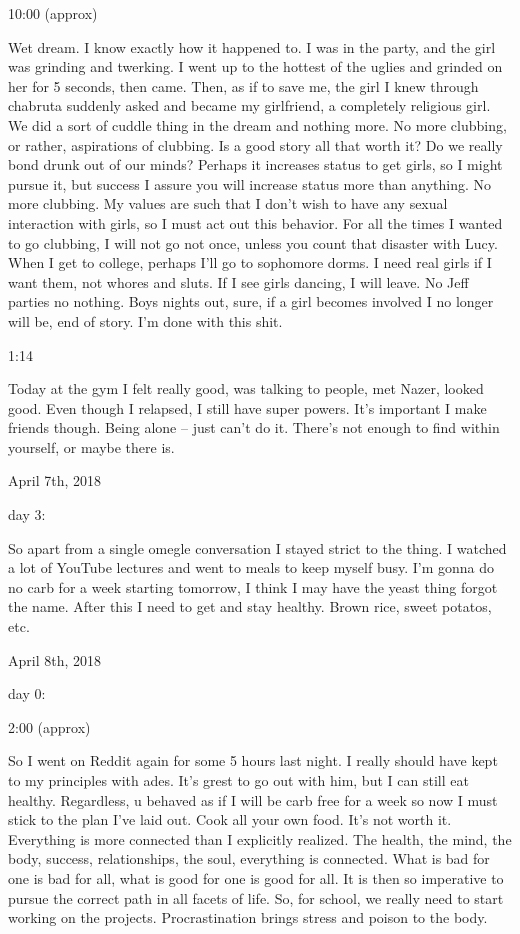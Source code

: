 10:00 (approx)

Wet dream. I know exactly how it happened to. I was in the party, and
the girl was grinding and twerking. I went up to the hottest of the
uglies and grinded on her for 5 seconds, then came. Then, as if to save
me, the girl I knew through chabruta suddenly asked and became my
girlfriend, a completely religious girl. We did a sort of cuddle thing
in the dream and nothing more. No more clubbing, or rather, aspirations
of clubbing. Is a good story all that worth it? Do we really bond drunk
out of our minds? Perhaps it increases status to get girls, so I might
pursue it, but success I assure you will increase status more than
anything. No more clubbing. My values are such that I don't wish to have
any sexual interaction with girls, so I must act out this behavior. For
all the times I wanted to go clubbing, I will not go not once, unless
you count that disaster with Lucy. When I get to college, perhaps I'll
go to sophomore dorms. I need real girls if I want them, not whores and
sluts. If I see girls dancing, I will leave. No Jeff parties no nothing.
Boys nights out, sure, if a girl becomes involved I no longer will be,
end of story. I'm done with this shit.

1:14

Today at the gym I felt really good, was talking to people, met Nazer,
looked good. Even though I relapsed, I still have super powers. It's
important I make friends though. Being alone -- just can't do it.
There's not enough to find within yourself, or maybe there is.

\bigskip
\bigskip
April 7th, 2018

day 3:

So apart from a single omegle conversation I stayed strict to the thing.
I watched a lot of YouTube lectures and went to meals to keep myself
busy. I'm gonna do no carb for a week starting tomorrow, I think I may
have the yeast thing forgot the name. After this I need to get and stay
healthy. Brown rice, sweet potatos, etc.

\bigskip
\bigskip
April 8th, 2018

day 0:

2:00 (approx)

So I went on Reddit again for some 5 hours last night. I really should
have kept to my principles with ades. It's grest to go out with him, but
I can still eat healthy. Regardless, u behaved as if I will be carb free
for a week so now I must stick to the plan I've laid out. Cook all your
own food. It's not worth it. Everything is more connected than I
explicitly realized. The health, the mind, the body, success,
relationships, the soul, everything is connected. What is bad for one is
bad for all, what is good for one is good for all. It is then so
imperative to pursue the correct path in all facets of life. So, for
school, we really need to start working on the projects. Procrastination
brings stress and poison to the body.

